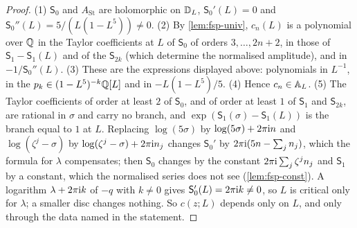 \begin{proof}
(1) $\mathsf S_0$ and $A_{\mathrm{St}}$ are holomorphic on $\mathbb{D}_L$, $\mathsf S_0'(L)=0$ and $\mathsf S_0''(L)=5/(L(1-L^5))\neq0$. (2) By \cref{lem:fsp-univ}, $c_n(L)$ is a polynomial over $\mathbb{Q}$ in the Taylor coefficients at $L$ of $\mathsf S_0$ of orders $3,\dots,2n+2$, in those of $\mathsf S_1-\mathsf S_1(L)$ and of the $\mathsf S_{2k}$ (which determine the normalised amplitude), and in $-1/\mathsf S_0''(L)$. (3) These are the expressions displayed above: polynomials in $L^{-1}$, in the $p_k\in(1-L^5)^{-k}\mathbb{Q}[L]$ and in $-L(1-L^5)/5$. (4) Hence $c_n\in\mathbb{A}_{L}$. (5) The Taylor coefficients of order at least $2$ of $\mathsf S_0$, and of order at least $1$ of $\mathsf S_1$ and $\mathsf S_{2k}$, are rational in $\sigma$ and carry no branch, and $\exp(\mathsf S_1(\sigma)-\mathsf S_1(L))$ is the branch equal to $1$ at $L$. Replacing $\log(5\sigma)$ by $\log(5\sigma)+2\pi\mathrm{i} n$ and $\log(\zeta^j-\sigma)$ by $\log(\zeta^j-\sigma)+2\pi\mathrm{i} n_j$ changes $\mathsf S_0'$ by $2\pi\mathrm{i}(5n-\sum_jn_j)$, which the formula for $\lambda$ compensates; then $\mathsf S_0$ changes by the constant $2\pi\mathrm{i}\sum_j\zeta^jn_j$ and $\mathsf S_1$ by a constant, which the normalised series does not see (\cref{lem:fsp-const}). A logarithm $\lambda+2\pi\mathrm{i} k$ of $-q$ with $k\neq0$ gives $\mathsf S_0'(L)=2\pi\mathrm{i} k\neq0$, so $L$ is critical only for $\lambda$; a smaller disc changes nothing. So $c(z;L)$ depends only on $L$, and only through the data named in the statement.
\end{proof}

